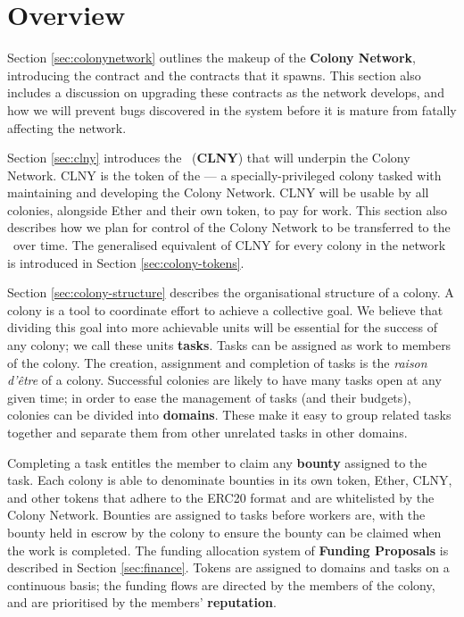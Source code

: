 \section{Overview}

Section \ref{sec:colonynetwork} outlines the makeup of the \textbf{Colony Network}, introducing the  contract and the  contracts that it spawns. This section also includes a discussion on upgrading these contracts as the network develops, and how we will prevent bugs discovered in the system before it is mature from fatally affecting the network.

Section \ref{sec:clny} introduces the \rcts\ (\textbf{CLNY}) that will underpin the Colony Network. CLNY is the token of the \textbf{\rc} --- a specially-privileged colony tasked with maintaining and developing the Colony Network. CLNY will be usable by all colonies, alongside Ether and their own token, to pay for work. This section also describes how we plan for control of the Colony Network to be transferred to the \rc\ over time. The generalised equivalent of CLNY for every colony in the network is introduced in Section \ref{sec:colony-tokens}.

Section \ref{sec:colony-structure} describes the organisational structure of a colony. A colony is a tool to coordinate effort to achieve a collective goal. We believe that dividing this goal into more achievable units will be essential for the success of any colony; we call these units \textbf{tasks}. Tasks can be assigned as work to members of the colony. The creation, assignment and completion of tasks is the \emph{raison d'{\^e}tre} of a colony. Successful colonies are likely to have many tasks open at any given time; in order to ease the management of tasks (and their budgets), colonies can be divided into \textbf{domains}. These make it easy to group related tasks together and separate them from other unrelated tasks in other domains.

Completing a task entitles the member to claim any \textbf{bounty} assigned to the task. Each colony is able to denominate bounties in its own token, Ether, CLNY, and other tokens that adhere to the ERC20 format \cite{erc20} and are whitelisted by the Colony Network. Bounties are assigned to tasks before workers are, with the bounty held in escrow by the colony to ensure the bounty can be claimed when the work is completed. The funding allocation system of \textbf{Funding Proposals} is described in Section \ref{sec:finance}. Tokens are assigned to domains and tasks on a continuous basis; the funding flows are directed by the members of the colony, and are prioritised by the members' \textbf{reputation}.

